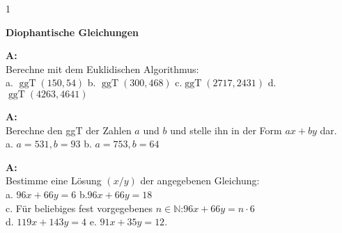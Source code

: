 \documentclass[landscape,twocolumn,a4paper]{article}
\begin{document}
\newcommand{\ggT}{\operatorname{ggT}}
\newcommand{\Mod}[3]{#1\equiv#2\mod#3}
\newcommand\x{1}
\setcounter {y} {1}

\parindent 0mm



\textbf{Diophantische Gleichungen} 
\bigskip

% 
%
%
 
\textbf{A:}   \\
Berechne mit dem Euklidischen Algorithmus: \\
a.  $\ggT(150,54)$ \quad b. $\ggT(300,468)$ \quad 
 c.$\ggT(2717,2431)$ \quad d. $\ggT(4263,4641)$
\bigskip {}
 
\textbf{A:}   \\
Berechne den ggT der Zahlen $a$ und $b$ und stelle ihn in der Form $ax + by$ dar. \\
a.   $ a = 531, b = 93$  \quad b. $ a = 753, b = 64$
\bigskip {}

\textbf{A:}   \\
Bestimme eine Lösung $(x/y)$ der angegebenen Gleichung: \\
a.  $96x+66y=6$ \quad b.$96x+66y=18$ \\
 c. Für beliebiges fest vorgegebenes $n\in\mathbb{N}$:\quad $96x+66y=n\cdot 6$ \\
 d.  $119x+143y=4$ \quad e. $91x+35y=12$.
\bigskip {}
 
\end{document}
